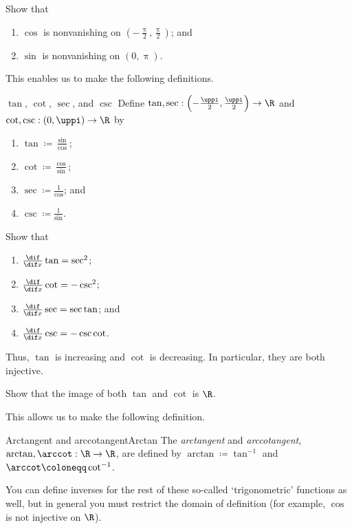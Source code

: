 \begin{exr}{}{}
Show that
\begin{enumerate}
\item $\cos$ is nonvanishing on $\left( -\frac{\uppi}{2},\frac{\uppi}{2}\right)$; and
\item $\sin$ is nonvanishing on $(0,\uppi )$.
\end{enumerate}
\end{exr}
This enables us to make the following definitions.
\begin{dfn}{$\tan$, $\cot$, $\sec$, and $\csc$}{}
Define $\tan ,\sec :\left( -\frac{\uppi}{2},\frac{\uppi}{2}\right) \rightarrow \R$ and $\cot ,\csc :(0,\uppi )\rightarrow \R$ by
\begin{enumerate}
\item $\tan \coloneqq \frac{\sin}{\cos}$;
\item $\cot \coloneqq \frac{\cos}{\sin}$;
\item $\sec \coloneqq \frac{1}{\cos}$; and
\item $\csc \coloneqq \frac{1}{\sin}$.
\end{enumerate}
\end{dfn}
\begin{exr}{}{}
Show that
\begin{enumerate}
\item $\frac{\dif}{\dif x}\tan =\sec ^2$;
\item $\frac{\dif}{\dif x}\cot =-\csc ^2$;
\item $\frac{\dif}{\dif x}\sec =\sec \tan$; and
\item $\frac{\dif}{\dif x}\csc =-\csc \cot$.
\end{enumerate}
\end{exr}
Thus, $\tan$ is increasing and $\cot$ is decreasing.  In particular, they are both injective.
\begin{exr}{}{}
Show that the image of both $\tan$ and $\cot$ is $\R$.
\end{exr}
This allows us to make the following definition.
\begin{dfn}{Arctangent and arccotangent}{Arctan}
The \emph{arctangent} and \emph{arccotangent}, $\arctan ,\arccot :\R \rightarrow \R$, are defined by $\arctan \coloneqq \tan ^{-1}$ and $\arccot \coloneqq \cot ^{-1}$.
\begin{rmk}
You can define inverses for the rest of these so-called `trigonometric' functions as well, but in general you must restrict the domain of definition (for example, $\cos$ is not injective on $\R$).
\end{rmk}
\end{dfn}
